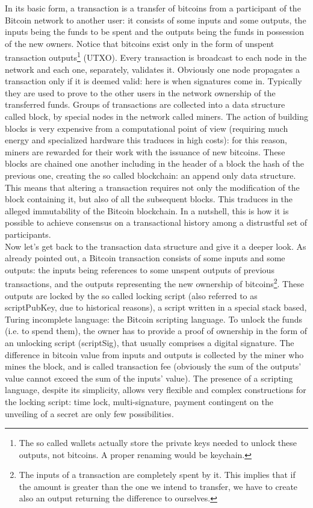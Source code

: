 \bigskip
\noindent
In its basic form, a transaction is a transfer of bitcoins from a participant of the Bitcoin network to another user: it consists of some inputs and some outputs, the inputs being the funds to be spent and the outputs being the funds in possession of the new owners. Notice that bitcoins exist only in the form of unspent transaction outputs\footnote{The so called wallets actually store the private keys needed to unlock these outputs, not bitcoins. A proper renaming would be keychain.} (UTXO). Every transaction is broadcast to each node in the network and each one, separately, validates it. Obviously one node propagates a transaction only if it is deemed valid: here is when signatures come in. Typically they are used to prove to the other users in the network ownership of the transferred funds. Groups of transactions are collected into a data structure called block, by special nodes in the network called miners. The action of building blocks is very expensive from a computational point of view (requiring much energy and specialized hardware this traduces in high costs): for this reason, miners are rewarded for their work with the issuance of new bitcoins. These blocks are chained one another including in the header of a block the hash of the previous one, creating the so called blockchain: an append only data structure. This means that altering a transaction requires not only the modification of the block containing it, but also of all the subsequent blocks. This traduces in the alleged immutability of the Bitcoin blockchain. In a nutshell, this is how it is possible to achieve consensus on a transactional history among a distrustful set of participants.
\\
Now let's get back to the transaction data structure and give it a deeper look. As already pointed out, a Bitcoin transaction consists of some inputs and some outputs: the inputs being references to some unspent outputs of previous transactions, and the outputs representing the new ownership of bitcoins\footnote{The inputs of a transaction are completely spent by it. This implies that if the amount is greater than the one we intend to transfer, we have to create also an output returning the difference to ourselves.}. These outputs are locked by the so called locking script (also referred to as scriptPubKey, due to historical reasons), a script written in a special stack based, Turing incomplete language: the Bitcoin scripting language. To unlock the funds (i.e. to spend them), the owner has to provide a proof of ownership in the form of an unlocking script (scriptSig), that usually comprises a digital signature. The difference in bitcoin value from inputs and outputs is collected by the miner who mines the block, and is called transaction fee (obviously the sum of the outputs' value cannot exceed the sum of the inputs' value). The presence of a scripting language, despite its simplicity, allows very flexible and complex constructions for the locking script: time lock, multi-signature, payment contingent on the unveiling of a secret are only few possibilities.

